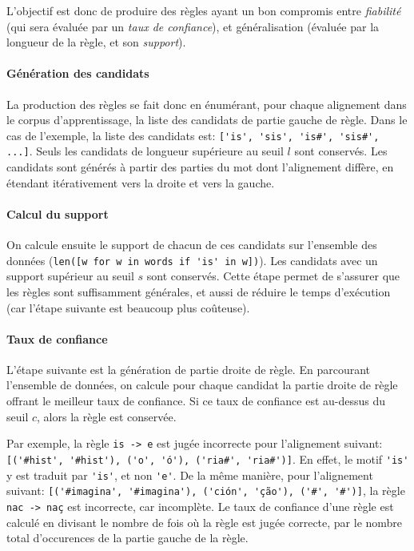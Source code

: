 \documentclass{article}
\begin{document}
L'objectif est donc de produire des règles ayant un bon compromis entre \emph{fiabilité} (qui sera évaluée par un \emph{taux de confiance}), et généralisation (évaluée par la longueur de la règle, et son \emph{support}).

\paragraph{Génération des candidats}
La production des règles se fait donc en énumérant, pour chaque alignement dans le corpus d'apprentissage, la liste des candidats de partie gauche de règle. Dans le cas de l'exemple, la liste des candidats est: \verb|['is', 'sis', 'is#', 'sis#', ...]|. Seuls les candidats de longueur supérieure au seuil $l$ sont conservés. Les candidats sont générés à partir des parties du mot dont l'alignement diffère, en étendant itérativement vers la droite et vers la gauche.

\paragraph{Calcul du support}
On calcule ensuite le support de chacun de ces candidats sur l'ensemble des données (\verb|len([w for w in words if 'is' in w])|).
Les candidats avec un support supérieur au seuil $s$ sont conservés. Cette étape permet de s'assurer que les règles sont suffisamment générales, et aussi de réduire le temps d'exécution (car l'étape suivante est beaucoup plus coûteuse).

\paragraph{Taux de confiance}
L'étape suivante est la génération de partie droite de règle. En parcourant l'ensemble de données, on calcule pour chaque candidat la partie droite de règle offrant le meilleur taux de confiance. Si ce taux de confiance est au-dessus du seuil $c$, alors la règle est conservée.

Par exemple, la règle \verb|is -> e| est jugée incorrecte pour l'alignement suivant: \verb|[('#hist', '#hist'), ('o', 'ó'), ('ria#', 'ria#')]|. En effet, le motif \verb|'is'| y est traduit par \verb|'is'|, et non \verb|'e'|.
De la même manière, pour l'alignement suivant: \verb|[('#imagina', '#imagina'), ('ción', 'ção'), ('#', '#')]|, la règle \verb|nac -> naç| est incorrecte, car incomplète. Le taux de confiance d'une règle est calculé en divisant le nombre de fois où la règle est jugée correcte, par le nombre total d'occurences de la partie gauche de la règle.
\end{document}
